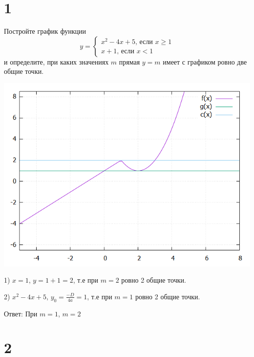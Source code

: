 \documentclass{article}
\begin{document}
\section{1}
Постройте график функции
\begin{equation*}
y = 
 \begin{cases}
   x^2-4x+5 \text{, если } x \geq 1 \\
   x+1 \text{, если } x<1
 \end{cases}
\end{equation*}
и определите, при каких значениях $m$ прямая $y = m$ имеет с графиком ровно две общие точки.

\includegraphics [scale=0.5]{plot.png}

1) $x=1$, $y=1+1=2$, т.е при $m=2$ ровно 2 общие точки.

2) $x^2-4x+5$,
$y_0 = \frac{-D}{4a}=1$, т.е при $m=1$ ровно 2 общие точки.

Ответ: При $m=1$, $m=2$

\section{2}
\end{document}
